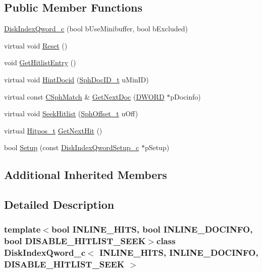 \subsection*{Public Member Functions}
\begin{DoxyCompactItemize}
\item 
\hyperlink{classDiskIndexQword__c_a34f89c8fc4d1823e1443588e489eb3df}{Disk\-Index\-Qword\-\_\-c} (bool b\-Use\-Minibuffer, bool b\-Excluded)
\item 
virtual void \hyperlink{classDiskIndexQword__c_a97747c8101848e9c35042c034f37a1a4}{Reset} ()
\item 
void \hyperlink{classDiskIndexQword__c_add6ce5247bb877bc9a06b3e0025d0e71}{Get\-Hitlist\-Entry} ()
\item 
virtual void \hyperlink{classDiskIndexQword__c_af907be47b2b72a4cc557e000328c86f1}{Hint\-Docid} (\hyperlink{sphinx_8h_a3176771631c12a9e4897272003e6b447}{Sph\-Doc\-I\-D\-\_\-t} u\-Min\-I\-D)
\item 
virtual const \hyperlink{classCSphMatch}{C\-Sph\-Match} \& \hyperlink{classDiskIndexQword__c_ab40909f9581d80f1d60341f666c489b3}{Get\-Next\-Doc} (\hyperlink{sphinxstd_8h_a798af1e30bc65f319c1a246cecf59e39}{D\-W\-O\-R\-D} $\ast$p\-Docinfo)
\item 
virtual void \hyperlink{classDiskIndexQword__c_abb795c0d543535a2418193699c0561d6}{Seek\-Hitlist} (\hyperlink{sphinx_8h_a0fb3b64afebef33c61367714754eaa90}{Sph\-Offset\-\_\-t} u\-Off)
\item 
virtual \hyperlink{sphinx_8h_af1385e83d53e0648b15eae6d8f101847}{Hitpos\-\_\-t} \hyperlink{classDiskIndexQword__c_aee48b9a8e515921e03e885f6b8d4f92a}{Get\-Next\-Hit} ()
\item 
bool \hyperlink{classDiskIndexQword__c_ab449a897608050b19bab605107bc42f5}{Setup} (const \hyperlink{classDiskIndexQwordSetup__c}{Disk\-Index\-Qword\-Setup\-\_\-c} $\ast$p\-Setup)
\end{DoxyCompactItemize}
\subsection*{Additional Inherited Members}


\subsection{Detailed Description}
\subsubsection*{template$<$bool I\-N\-L\-I\-N\-E\-\_\-\-H\-I\-T\-S, bool I\-N\-L\-I\-N\-E\-\_\-\-D\-O\-C\-I\-N\-F\-O, bool D\-I\-S\-A\-B\-L\-E\-\_\-\-H\-I\-T\-L\-I\-S\-T\-\_\-\-S\-E\-E\-K$>$class Disk\-Index\-Qword\-\_\-c$<$ I\-N\-L\-I\-N\-E\-\_\-\-H\-I\-T\-S, I\-N\-L\-I\-N\-E\-\_\-\-D\-O\-C\-I\-N\-F\-O, D\-I\-S\-A\-B\-L\-E\-\_\-\-H\-I\-T\-L\-I\-S\-T\-\_\-\-S\-E\-E\-K $>$}

